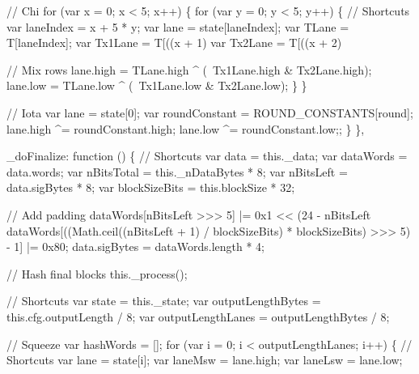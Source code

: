 \begin{DoxyCodeInclude}
                \textcolor{comment}{// Chi}
                \textcolor{keywordflow}{for} (var x = 0; x < 5; x++) \{
                    \textcolor{keywordflow}{for} (var y = 0; y < 5; y++) \{
                        \textcolor{comment}{// Shortcuts}
                        var laneIndex = x + 5 * y;
                        var lane = state[laneIndex];
                        var TLane = T[laneIndex];
                        var Tx1Lane = T[((x + 1) %
                        var Tx2Lane = T[((x + 2) %

                        \textcolor{comment}{// Mix rows}
                        lane.high = TLane.high ^ (~Tx1Lane.high & Tx2Lane.high);
                        lane.low  = TLane.low  ^ (~Tx1Lane.low  & Tx2Lane.low);
                    \}
                \}

                \textcolor{comment}{// Iota}
                var lane = state[0];
                var roundConstant = ROUND\_CONSTANTS[round];
                lane.high ^= roundConstant.high;
                lane.low  ^= roundConstant.low;;
            \}
        \},

        \_doFinalize: \textcolor{keyword}{function} () \{
            \textcolor{comment}{// Shortcuts}
            var data = this.\_data;
            var dataWords = data.words;
            var nBitsTotal = this.\_nDataBytes * 8;
            var nBitsLeft = data.sigBytes * 8;
            var blockSizeBits = this.blockSize * 32;

            \textcolor{comment}{// Add padding}
            dataWords[nBitsLeft >>> 5] |= 0x1 << (24 - nBitsLeft %
            dataWords[((Math.ceil((nBitsLeft + 1) / blockSizeBits) * blockSizeBits) >>> 5) - 1] |= 0x80;
            data.sigBytes = dataWords.length * 4;

            \textcolor{comment}{// Hash final blocks}
            this.\_process();

            \textcolor{comment}{// Shortcuts}
            var state = this.\_state;
            var outputLengthBytes = this.cfg.outputLength / 8;
            var outputLengthLanes = outputLengthBytes / 8;

            \textcolor{comment}{// Squeeze}
            var hashWords = [];
            \textcolor{keywordflow}{for} (var i = 0; i < outputLengthLanes; i++) \{
                \textcolor{comment}{// Shortcuts}
                var lane = state[i];
                var laneMsw = lane.high;
                var laneLsw = lane.low;


\end{DoxyCodeInclude}
